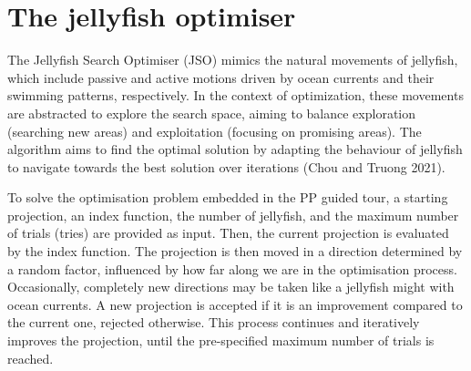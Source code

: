 \documentclass[
  12pt,
]{interact}
\theoremstyle{plain}
\begin{document}
\section{The jellyfish optimiser}\label{sec-JSO}

The Jellyfish Search Optimiser (JSO) mimics the natural movements of
jellyfish, which include passive and active motions driven by ocean
currents and their swimming patterns, respectively. In the context of
optimization, these movements are abstracted to explore the search
space, aiming to balance exploration (searching new areas) and
exploitation (focusing on promising areas). The algorithm aims to find
the optimal solution by adapting the behaviour of jellyfish to navigate
towards the best solution over iterations (Chou and Truong 2021).

To solve the optimisation problem embedded in the PP guided tour, a
starting projection, an index function, the number of jellyfish, and the
maximum number of trials (tries) are provided as input. Then, the
current projection is evaluated by the index function. The projection is
then moved in a direction determined by a random factor, influenced by
how far along we are in the optimisation process. Occasionally,
completely new directions may be taken like a jellyfish might with ocean
currents. A new projection is accepted if it is an improvement compared
to the current one, rejected otherwise. This process continues and
iteratively improves the projection, until the pre-specified maximum
number of trials is reached.
\end{document}
